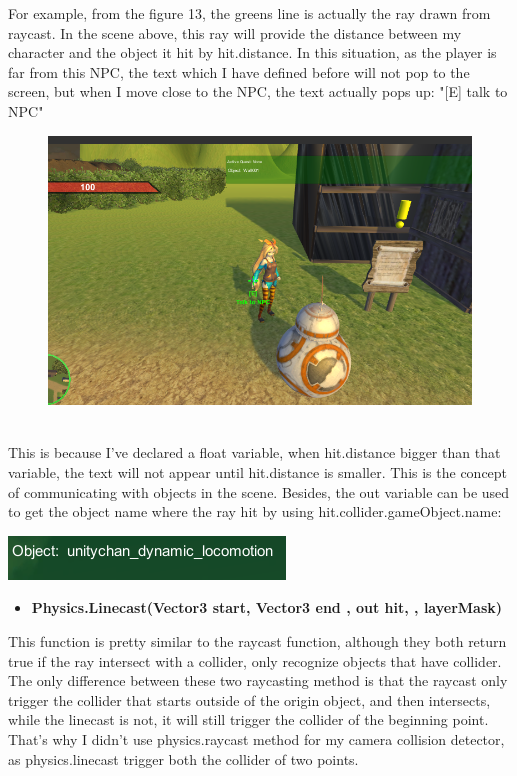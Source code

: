 \documentclass[a4paper, 13pt]{extarticle}
\begin{document}
 	For example, from the figure 13, the greens line is actually the ray drawn from raycast. In the scene above, this ray will provide the distance between my character and the object it hit by hit.distance. In this situation, as the player is far from this NPC, the text which I have defined before will not pop to the screen, but when I move close to the NPC, the text actually pops up: "[E] talk to NPC"
 	\begin{figure}[h]
 		
 			\begin{minipage}{1\textwidth}
 				\centering
 				\includegraphics[width=0.5\linewidth]{intructions/text_popup.png}
 				\centering
 				\label{fig:test15}
 			\end{minipage}
 		\end{figure}
 	\\[0.05cm]
 	This is because I've declared a float variable, when hit.distance bigger than that variable, the text will not appear until hit.distance is smaller. This is the concept of communicating with objects in the scene. Besides, the out variable can be used to get the object name where the ray hit by using hit.collider.gameObject.name: 	
 	\noindent\begin{minipage}{0.3\textwidth}
 		\includegraphics[width=\linewidth]{intructions/objectname.png}
 	\end{minipage}
 	\begin{itemize}
 		\item \bfseries Physics.Linecast(Vector3 start,  Vector3 end , out hit, , layerMask)	 	
 	\end{itemize}
 		This function is pretty similar to the raycast function, although they both return true if the ray intersect with a collider, only recognize objects that have collider. The only difference between these two raycasting method is that the raycast only trigger the collider that starts outside of the origin object, and then intersects,  while the linecast is not, it will still trigger the collider of the beginning point. That's why I didn't use physics.raycast method for my camera collision detector, as physics.linecast trigger both the collider of two points.
 
\end{document}
